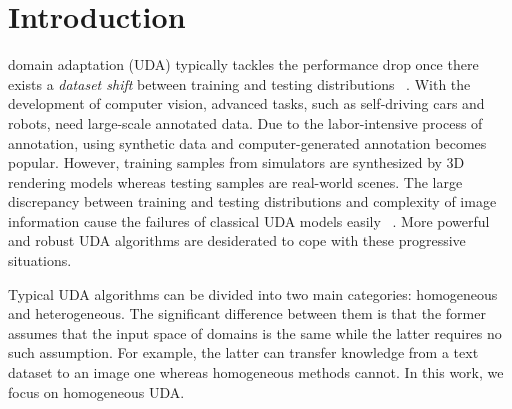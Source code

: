\documentclass[journal,twocolumn]{IEEEtran}
\theoremstyle{definition}
\begin{document}
\section{Introduction}
 domain adaptation (UDA) typically tackles the performance drop once there exists a \emph{dataset shift} between training and testing distributions 
~\cite{krizhevsky2012imagenet,ben2010theory,donahue2014decaf:,pmlr-v119-kumar20c}.  
With the development of computer vision, advanced tasks, such as self-driving cars and robots, need large-scale annotated data. Due to the labor-intensive process of annotation, using synthetic data and computer-generated annotation becomes popular. However, training samples from simulators are synthesized by 3D rendering models whereas testing samples are real-world scenes. The large discrepancy between training and testing distributions and complexity of image information cause the failures of classical UDA models easily 
~\cite{6847217,pan2010domain,7457281,NIPS2006_2983}. 
More powerful and robust UDA algorithms are desiderated to cope with these progressive situations.

Typical UDA algorithms can be divided into two main categories: homogeneous and heterogeneous. The significant difference between them is that the former assumes that the input space of domains is the same while the latter requires no such assumption. For example, the latter can transfer knowledge from a text dataset to an image one whereas homogeneous methods cannot. In this work, we focus on  homogeneous UDA. 
\end{document}
